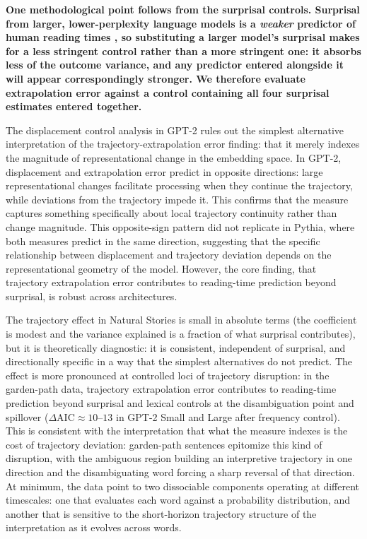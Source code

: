 \documentclass[12pt]{article}
\newcommand{\new}[1]{{\bfseries #1}}
\begin{document}
\new{One methodological point follows from the surprisal controls. Surprisal from larger, lower-perplexity language models is a \textit{weaker} predictor of human reading times \citep{oh2023b}, so substituting a larger model's surprisal makes for a less stringent control rather than a more stringent one: it absorbs less of the outcome variance, and any predictor entered alongside it will appear correspondingly stronger. We therefore evaluate extrapolation error against a control containing all four surprisal estimates entered together.}

The displacement control analysis in GPT-2 rules out the simplest alternative interpretation of the trajectory-extrapolation error finding: that it merely indexes the magnitude of representational change in the embedding space. In GPT-2, displacement and extrapolation error predict in opposite directions: large representational changes facilitate processing when they continue the trajectory, while deviations from the trajectory impede it. This confirms that the measure captures something specifically about local trajectory continuity rather than change magnitude. This opposite-sign pattern did not replicate in Pythia, where both measures predict in the same direction, suggesting that the specific relationship between displacement and trajectory deviation depends on the representational geometry of the model. However, the core finding, that trajectory extrapolation error contributes to reading-time prediction beyond surprisal, is robust across architectures.

The trajectory effect in Natural Stories is small in absolute terms (the coefficient is modest and the variance explained is a fraction of what surprisal contributes), but it is theoretically diagnostic: it is consistent, independent of surprisal, and directionally specific in a way that the simplest alternatives do not predict. The effect is more pronounced at controlled loci of trajectory disruption: in the garden-path data, trajectory extrapolation error contributes to reading-time prediction beyond surprisal and lexical controls at the disambiguation point and spillover ($\Delta\text{AIC} \approx 10\text{--}13$ in GPT-2 Small and Large after frequency control). This is consistent with the interpretation that what the measure indexes is the cost of trajectory deviation: garden-path sentences epitomize this kind of disruption, with the ambiguous region building an interpretive trajectory in one direction and the disambiguating word forcing a sharp reversal of that direction. At minimum, the data point to two dissociable components operating at different timescales: one that evaluates each word against a probability distribution, and another that is sensitive to the short-horizon trajectory structure of the interpretation as it evolves across words.
\end{document}
